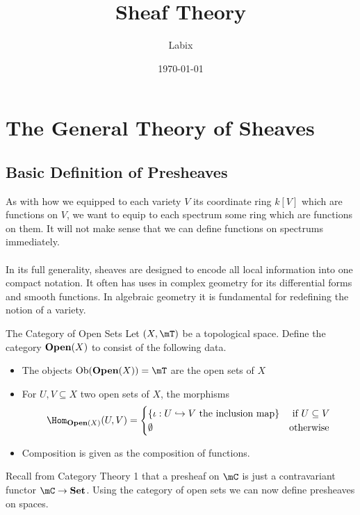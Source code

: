 \documentclass[a4paper]{article}
\title{Sheaf Theory}
\author{Labix}
\date{\today}
\begin{document}
\maketitle
\begin{abstract}
\end{abstract}
\pagebreak
\tableofcontents
\pagebreak

\section{The General Theory of Sheaves}
\subsection{Basic Definition of Presheaves}
As with how we equipped to each variety $V$ its coordinate ring $k[V]$ which are functions on $V$, we want to equip to each spectrum some ring which are functions on them. It will not make sense that we can define functions on spectrums immediately. \\~\\

In its full generality, sheaves are designed to encode all local information into one compact notation. It often has uses in complex geometry for its differential forms and smooth functions. In algebraic geometry it is fundamental for redefining the notion of a variety. 

\begin{defn}{The Category of Open Sets}{} Let $(X,\mT)$ be a topological space. Define the category $\bold{Open}(X)$ to consist of the following data. 
\begin{itemize}
\item The objects $\text{Ob}(\bold{Open}(X))=\mT$ are the open sets of $X$
\item For $U,V\subseteq X$ two open sets of $X$, the morphisms $$\Hom_{\bold{Open}(X)}(U,V)=\begin{cases}
\{\iota:U\hookrightarrow V\text{ the inclusion map}\} & \text{ if } U\subseteq V\\
\emptyset & \text{otherwise}
\end{cases}$$
\item Composition is given as the composition of functions. 
\end{itemize}
\end{defn}

Recall from Category Theory 1 that a presheaf on $\mC$ is just a contravariant functor $\mC\to\bold{Set}$. Using the category of open sets we can now define presheaves on spaces. 
\end{document}
